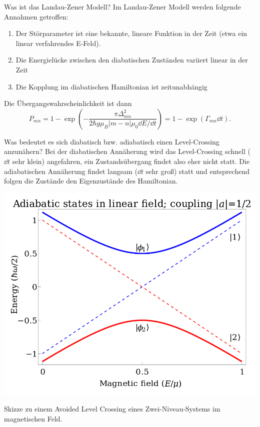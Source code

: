 \begin{fquestion}{Was ist das Landau-Zener Modell?}
    Im Landau-Zener Modell werden folgende Annahmen getroffen:
    \begin{enumerate}
        \item Der Störparameter ist eine bekannte, lineare Funktion in der Zeit (etwa ein linear verfahrendes E-Feld).
        \item Die Energielücke zwischen den diabatischen Zuständen variiert linear in der Zeit
        \item Die Kopplung im diabatischen Hamiltonian ist zeitunabhängig
    \end{enumerate}
    Die Übergangswahrscheinlichkeit ist dann
    \[ P_{mn} = 1 - \exp \left( -\frac{ \pi \Delta_{m n}^2}{2\hbar g \mu_B |m - n| \mu_0 \dd E / \dd t} \right) = 1 - \exp(\Gamma_{mn} \dd t). \]
\end{fquestion}

\begin{fquestion}{Was bedeutet es sich diabatisch bzw. adiabatisch einen Level-Crossing anzunähern?}
    Bei der diabatischen Annäherung wird das Level-Crossing schnell ($\dd t$ sehr klein) angefahren, ein Zustandsübergang findet also eher nicht statt. 
    Die adiabatischen Annäherung findet langsam ($\dd t$ sehr groß) statt und entsprechend folgen die Zustände den Eigenzustände des Hamiltonian.
    \begin{center}
        \includegraphics[scale=0.2]{img/Avoided_crossing_in_linear_field.svg.png}
    \end{center}
    Skizze zu einem Avoided Level Crossing eines Zwei-Niveau-Systems im magnetischen Feld.  
\end{fquestion}

